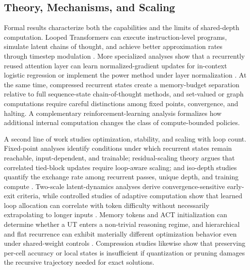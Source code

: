 \subsection{Theory, Mechanisms, and Scaling}

Formal results characterize both the capabilities and the limits of shared-depth computation. Looped Transformers can execute instruction-level programs, simulate latent chains of thought, and achieve better approximation rates through timestep modulation \citep{giannou2023looped,saunshi2025latentthoughts,xu2025expressive}. More specialized analyses show that a recurrently reused attention layer can learn normalized-gradient updates for in-context logistic regression or implement the power method under layer normalization \citep{wu2026powermethod}. At the same time, compressed recurrent states create a memory-budget separation relative to full sequence-state chain-of-thought methods, and set-valued or graph computations require careful distinctions among fixed points, convergence, and halting. A complementary reinforcement-learning analysis formalizes how additional internal computation changes the class of compute-bounded policies.

A second line of work studies optimization, stability, and scaling with loop count. Fixed-point analyses identify conditions under which recurrent states remain reachable, input-dependent, and trainable; residual-scaling theory argues that correlated tied-block updates require loop-aware scaling; and iso-depth studies quantify the exchange rate among recurrent passes, unique depth, and training compute \citep{labovich2026stability,wang2026residualscaling,schwethelm2026much}. Two-scale latent-dynamics analyses derive convergence-sensitive early-exit criteria, while controlled studies of adaptive computation show that learned loop allocation can correlate with token difficulty without necessarily extrapolating to longer inputs \citep{pappone2025twoscale,moosa2026dynamiccompute}. Memory tokens and ACT initialization can determine whether a UT enters a non-trivial reasoning regime, and hierarchical and flat recurrence can exhibit materially different optimization behavior even under shared-weight controls \citep{sapunov2026utm,han2026hierarchicalflat}. Compression studies likewise show that preserving per-cell accuracy or local states is insufficient if quantization or pruning damages the recursive trajectory needed for exact solutions.

